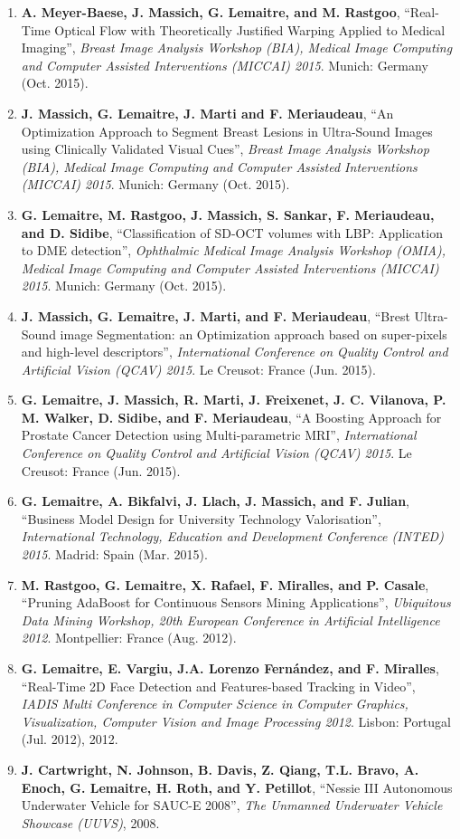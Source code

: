 {\begin{enumerate}
\item \textbf{A. Meyer-Baese, J. Massich, G. Lemaitre, and M. Rastgoo}, ``Real-Time Optical Flow with Theoretically Justified Warping Applied to Medical Imaging'', \textit{Breast Image Analysis Workshop (BIA), Medical Image Computing and Computer Assisted Interventions (MICCAI) 2015}. Munich: Germany (Oct. 2015).
\item \textbf{J. Massich, G. Lemaitre, J. Marti and F. Meriaudeau}, ``An Optimization Approach to Segment Breast Lesions in Ultra-Sound Images using Clinically Validated Visual Cues'', \textit{Breast Image Analysis Workshop (BIA), Medical Image Computing and Computer Assisted Interventions (MICCAI) 2015}. Munich: Germany (Oct. 2015).
\item \textbf{G. Lemaitre, M. Rastgoo, J. Massich, S. Sankar, F. Meriaudeau, and D. Sidibe}, ``Classification of SD-OCT volumes with LBP: Application to DME detection'', \textit{Ophthalmic Medical Image Analysis Workshop (OMIA), Medical Image Computing and Computer Assisted Interventions (MICCAI) 2015}. Munich: Germany (Oct. 2015).
\item \textbf{J. Massich, G. Lemaitre, J. Marti, and F. Meriaudeau}, ``Brest Ultra-Sound image Segmentation: an Optimization approach based on super-pixels and high-level descriptors'', \textit{International Conference on Quality Control and Artificial Vision (QCAV) 2015}. Le Creusot: France (Jun. 2015).
\item \textbf{G. Lemaitre, J. Massich, R. Marti, J. Freixenet, J. C. Vilanova, P. M. Walker, D. Sidibe, and F. Meriaudeau}, ``A Boosting Approach for Prostate Cancer Detection using Multi-parametric MRI'', \textit{International Conference on Quality Control and Artificial Vision (QCAV) 2015}. Le Creusot: France (Jun. 2015).
\item \textbf{G. Lemaitre, A. Bikfalvi, J. Llach, J. Massich, and F. Julian}, ``Business Model Design for University Technology Valorisation'', \textit{International Technology, Education and Development Conference (INTED) 2015}. Madrid: Spain (Mar. 2015).
\item \textbf{M. Rastgoo, G. Lemaitre, X. Rafael, F. Miralles, and P. Casale}, ``Pruning AdaBoost for Continuous Sensors Mining Applications'', \textit{Ubiquitous Data Mining Workshop, 20th European Conference in Artificial Intelligence 2012}. Montpellier: France (Aug. 2012).
\item \textbf{G. Lemaitre, E. Vargiu, J.A. Lorenzo Fernández, and F. Miralles}, ``Real-Time 2D Face Detection and Features-based Tracking in Video'', \textit{IADIS Multi Conference in Computer Science in Computer Graphics, Visualization, Computer Vision and Image Processing 2012}. Lisbon: Portugal (Jul. 2012), 2012.
\item \textbf{J. Cartwright, N. Johnson, B. Davis, Z. Qiang, T.L. Bravo, A. Enoch, G. Lemaitre, H. Roth, and Y. Petillot}, ``Nessie III Autonomous Underwater Vehicle for SAUC-E 2008'', \textit{The Unmanned Underwater Vehicle Showcase (UUVS)}, 2008.
\end{enumerate}

}